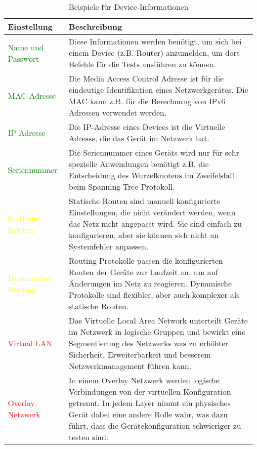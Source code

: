 \documentclass[
	ngerman,
	toc=listof, %
	toc=bibliography, %
	footnotes=multiple, %
	parskip=half, %
	numbers=noendperiod %
]{scrartcl}
\begin{document}
			\begin{table}[!h]
				\begin{tabularx}{\textwidth}{lX}
					\toprule
					Einstellung & Beschreibung\\
					\midrule
					\textcolor{green}{Name und Passwort} & Diese Informationen werden benötigt, um sich bei einem Device (z.B. Router) anzumelden, um dort Befehle für die Tests ausführen zu können. \\	
					\textcolor{green}{MAC-Adresse} & Die Media Access Control Adresse ist für die eindeutige Identifikation eines Netzwerkgerätes. Die MAC kann z.B. für die Berechnung von IPv6 Adressen verwendet werden.\\
					\textcolor{green}{IP Adresse} & Die IP-Adresse eines Devices ist die Virtuelle Adresse, die das Gerät im Netzwerk hat. \\
					\textcolor{green}{Seriennummer} & Die Seriennummer eines Geräts wird nur für sehr spezielle Anwendungen benötigt z.B. die Entscheidung des Wurzelknotens im Zweifelsfall beim Spanning Tree Protokoll. \\
					\midrule
					\textcolor{yellow}{Statische Routen} & Statische Routen sind manuell konfigurierte Einstellungen, die nicht verändert werden, wenn das Netz nicht angepasst wird. Sie sind einfach zu konfigurieren, aber sie können sich nicht an Systemfehler anpassen. \\
					\textcolor{yellow}{Dynamisches Routing} & Routing Protokolle passen die konfigurierten Routen der Geräte zur Laufzeit an, um auf Änderungen im Netz zu reagieren. Dynamische Protokolle sind flexibler, aber auch komplexer als statische Routen. \\
					\midrule
					\textcolor{red}{Virtual LAN} & Das Virtuelle Local Area Network unterteilt Geräte im Netzwerk in logische Gruppen und bewirkt eine Segmentierung des Netzwerks was zu erhöhter Sicherheit, Erweiterbarkeit und besserem Netzwerkmanagement führen kann. \\
					\textcolor{red}{Overlay Netzwerk} & In einem Overlay Netzwerk werden logische Verbindungen von der virtuellen Konfiguration getrennt. In jedem Layer nimmt ein physisches Gerät dabei eine andere Rolle wahr, was dazu führt, dass die Gerätekonfiguration schwieriger zu testen sind. \\				
					\bottomrule
				\end{tabularx}
				\caption{Beispiele für Device-Informationen}
			\end{table}
			
			\newpage
\end{document}
